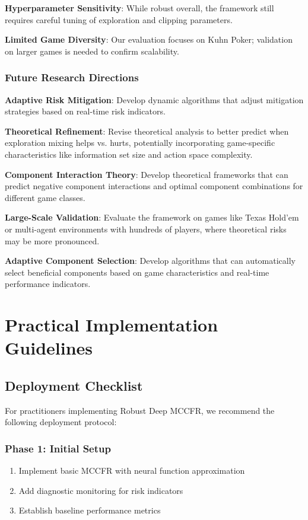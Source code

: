 \documentclass[12pt,a4paper]{article}
\begin{document}
\textbf{Hyperparameter Sensitivity}: While robust overall, the framework still requires careful tuning of exploration and clipping parameters.

\textbf{Limited Game Diversity}: Our evaluation focuses on Kuhn Poker; validation on larger games is needed to confirm scalability.

\subsubsection{Future Research Directions}

\textbf{Adaptive Risk Mitigation}: Develop dynamic algorithms that adjust mitigation strategies based on real-time risk indicators.

\textbf{Theoretical Refinement}: Revise theoretical analysis to better predict when exploration mixing helps vs. hurts, potentially incorporating game-specific characteristics like information set size and action space complexity.

\textbf{Component Interaction Theory}: Develop theoretical frameworks that can predict negative component interactions and optimal component combinations for different game classes.

\textbf{Large-Scale Validation}: Evaluate the framework on games like Texas Hold'em or multi-agent environments with hundreds of players, where theoretical risks may be more pronounced.

\textbf{Adaptive Component Selection}: Develop algorithms that can automatically select beneficial components based on game characteristics and real-time performance indicators.

\section{Practical Implementation Guidelines}
\label{sec:guidelines}

\subsection{Deployment Checklist}

For practitioners implementing Robust Deep MCCFR, we recommend the following deployment protocol:

\subsubsection{Phase 1: Initial Setup}
\begin{enumerate}
\item Implement basic MCCFR with neural function approximation
\item Add diagnostic monitoring for risk indicators
\item Establish baseline performance metrics
\end{enumerate}
\end{document}
